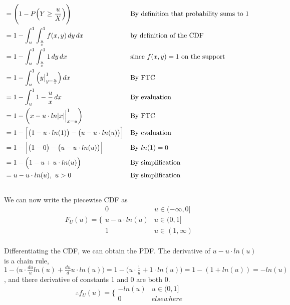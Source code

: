 \documentclass[11pt]{article}
\begin{document}
\begin{enumerate}
\begin{align}
                \\&= \Bigg( 1 - P\Big(Y \geq \frac{u}{X}\Big)\Bigg) \notag && \text{By definition that probability sums to 1}
                \\&= 1 - \int_{u}^{1} \int_{\frac{u}{x}}^{1} f(x,y) \,dy \,dx \notag && \text{by definition of the CDF}
                \\&= 1 - \int_{u}^{1} \int_{\frac{u}{x}}^{1} 1 \,dy \,dx \notag && \text{since \(f(x,y) = 1\) on the support}\\
                &= 1 - \int_{u}^{1} \Big( y \big|_{y = \frac{u}{x}}^{1} \Big) \,dx \notag && \text{By FTC}\\
                &= 1 - \int_{u}^{1} 1 - \frac{u}{x} \,dx \notag && \text{By evaluation}\\
                &= 1 -\bigg( x - u \cdot ln|x| \Big|_{x = u}^{1} \bigg) \notag && \text{By FTC}\\
                &= 1 - \Big[ \big( 1 - u \cdot ln(1) \big) - \big( u - u \cdot ln(u) \big) \Big] \notag && \text{By evaluation}\\
                &= 1 - \Big[ \big( 1 - 0 \big) - \big( u - u \cdot ln(u) \big) \Big] \notag && \text{By \(ln(1) = 0\)}\\
                &= 1 - \Big( 1 - u + u \cdot ln(u) \Big) \notag && \text{By simplification}\\
                &= u - u \cdot ln(u) , \text{ } u > 0 \notag && \text{By simplification}\\
                \notag
            \end{align}
            We can now write the piecewise CDF as
        $$F_U(u) = \Bigg\{ \begin{array}{cc}
        0 & u \in (-\infty, 0]\\
        u - u \cdot ln(u) & u \in (0, 1]\\
        1 & u \in (1, \infty) \end{array}$$
        \\Differentiating the CDF, we can obtain the PDF. The derivative of \(u - u \cdot ln(u)\) is a chain rule, \( 1 - \big(u \cdot \frac{du}{u}ln(u) + \frac{du}{d}u \cdot ln(u)\big) =  1 - \big(u \cdot \frac{1}{u} + 1 \cdot ln(u)\big) = 1 - (1 + ln(u)) = -ln(u)\), and there derivative of constants 1 and 0 are both 0.
                $$\boxed{ \therefore f_U(u) = \Bigg\{ \begin{array}{cc}
        -ln(u) & u \in (0, 1]\\
        0 & elsewhere \end{array}}$$
        

\end{enumerate}
\end{document}
